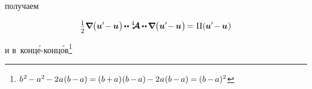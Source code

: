 \noindent
\foreignlanguage{russian}{получаем}

\[
\smalldisplaystyleonehalf \boldnabla \bigl(
\bm{u}' \hspace{-0.4ex} - \hspace{-0.1ex} \bm{u}
\hspace{.1ex} \bigr) \hspace{-0.2ex}
\dotdotp \stiffnesstensor \hspace{-0.1ex} \dotdotp \hspace{-0.15ex} \boldnabla \bigl(
\bm{u}' \hspace{-0.4ex} - \hspace{-0.1ex} \bm{u}
\hspace{.1ex} \bigr) \hspace{-0.25ex}
= \hspace{.1ex} \potential(\hspace{-0.1ex}\bm{u}' \hspace{-0.4ex} - \hspace{-0.1ex} \bm{u}\hspace{.1ex})
\]

\noindent
\foreignlanguage{russian}{и в~конц\'{е}\hbox{-}конц\'{о}в}\footnote{%
${b^{\hspace{.1ex}2} \hspace{-0.2ex} - a^2 \hspace{-0.2ex} - 2 \hspace{.1ex} a \hspace{.1ex} (b \hspace{-0.1ex} - \hspace{-0.2ex} a) \hspace{-0.1ex}
=\hspace{-0.1ex}  (b \hspace{-0.1ex} + \hspace{-0.2ex} a) \hspace{.1ex} (b \hspace{-0.1ex} - \hspace{-0.2ex} a) \hspace{-0.15ex} - 2 \hspace{.1ex} a \hspace{.1ex} (b \hspace{-0.1ex} - \hspace{-0.2ex} a) \hspace{-0.1ex}
= \hspace{-0.1ex} (b \hspace{-0.1ex} - \hspace{-0.2ex} a)^2}$}


